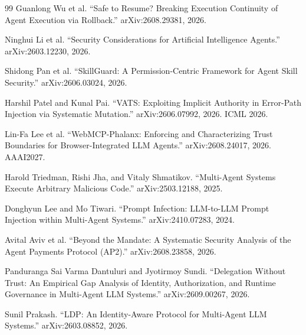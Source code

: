 \begin{thebibliography}{99}
Guanlong Wu et al.
``Safe to Resume? Breaking Execution Continuity of Agent Execution via Rollback.''
arXiv:2608.29381, 2026.

Ninghui Li et al.
``Security Considerations for Artificial Intelligence Agents.''
arXiv:2603.12230, 2026.

Shidong Pan et al.
``SkillGuard: A Permission-Centric Framework for Agent Skill Security.''
arXiv:2606.03024, 2026.

Harshil Patel and Kunal Pai.
``VATS: Exploiting Implicit Authority in Error-Path Injection via Systematic Mutation.''
arXiv:2606.07992, 2026. ICML 2026.

Lin-Fa Lee et al.
``WebMCP-Phalanx: Enforcing and Characterizing Trust Boundaries for Browser-Integrated LLM Agents.''
arXiv:2608.24017, 2026. AAAI2027.

Harold Triedman, Rishi Jha, and Vitaly Shmatikov.
``Multi-Agent Systems Execute Arbitrary Malicious Code.''
arXiv:2503.12188, 2025.

Donghyun Lee and Mo Tiwari.
``Prompt Infection: LLM-to-LLM Prompt Injection within Multi-Agent Systems.''
arXiv:2410.07283, 2024.

Avital Aviv et al.
``Beyond the Mandate: A Systematic Security Analysis of the Agent Payments Protocol (AP2).''
arXiv:2608.23858, 2026.

Panduranga Sai Varma Dantuluri and Jyotirmoy Sundi.
``Delegation Without Trust: An Empirical Gap Analysis of Identity, Authorization, and Runtime Governance in Multi-Agent LLM Systems.''
arXiv:2609.00267, 2026.

Sunil Prakash.
``LDP: An Identity-Aware Protocol for Multi-Agent LLM Systems.''
arXiv:2603.08852, 2026.
\end{thebibliography}

